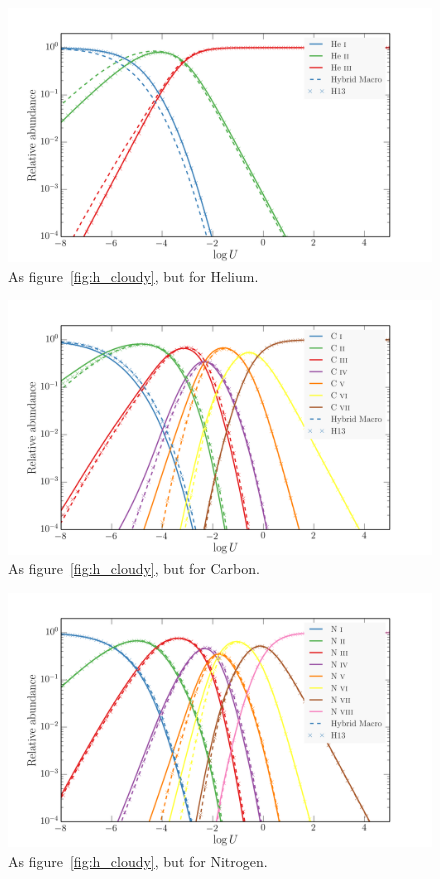 \begin{figure}
\centering
\includegraphics[width=1.0\textwidth]{figures/03-radtrans/he_comp.png}
\caption{
As figure~\ref{fig:h_cloudy}, but for Helium.
}
\label{fig:he_cloudy}
\end{figure}

\begin{figure}
\centering
\includegraphics[width=1.0\textwidth]{figures/03-radtrans/ca_comp.png}
\caption
{
As figure~\ref{fig:h_cloudy}, but for Carbon.
}
\label{fig:c_cloudy}
\end{figure}

\begin{figure}
\centering
\includegraphics[width=1.0\textwidth]{figures/03-radtrans/ni_comp.png}
\caption{
As figure~\ref{fig:h_cloudy}, but for Nitrogen.
}
\label{fig:n_cloudy}
\end{figure}

